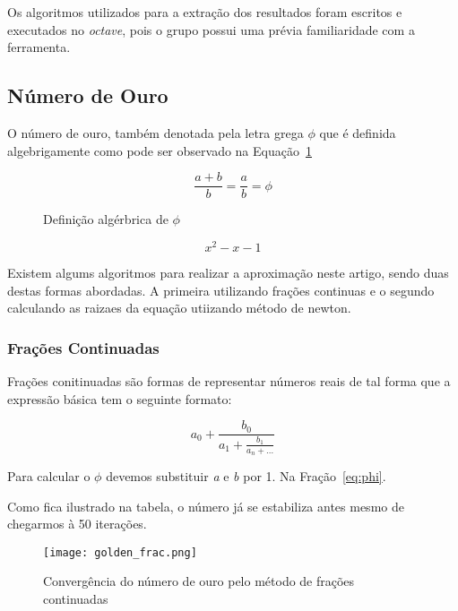 	Os algoritmos utilizados para a extração dos resultados foram escritos e
	executados no \emph{octave}, pois o grupo possui uma prévia familiaridade
	com a ferramenta. 
	
	\subsection{Número de Ouro}
		
		O número de ouro, também denotada pela letra grega $\phi$ que é
		definida algebrigamente como pode ser observado na
		Equação~\ref{eq:phi-algebrico}

		\begin{figure}[H]
			\centering
			\begin{equation}
				\frac{a+b}{b} = \frac{a}{b} = \phi
			\end{equation}
			\label{eq:phi-algebrico}
			\caption{Definição algérbrica de $\phi$}
		\end{figure}


		
		\begin{equation}
			x^2-x-1
		\end{equation}

		Existem algums algoritmos para realizar a aproximação neste artigo,
		sendo duas destas formas  abordadas. A primeira utilizando frações
		continuas e o segundo calculando as raizaes da equação utiizando método
		de newton.

		\subsubsection{Frações Continuadas}

			Frações conitinuadas são formas de representar números reais de tal
			forma que a expressão básica tem o seguinte formato:

			\begin{equation}\label{eq:phi}
				a_0 + \frac{b_0}{a_1 + \frac{b_1}{a_n + \dots}}
			\end{equation}

			Para calcular o $\phi$ devemos substituir \emph{a} e \emph{b} por 1.
			Na Fração~\ref{eq:phi}.

			

			Como fica ilustrado na tabela, o número já se estabiliza antes mesmo
			de chegarmos à 50 iterações.

			\begin{figure}[H]
				\centering
				\texttt{[image: golden\_frac.png]}
				\caption{Convergência do número de ouro pelo método de frações continuadas}
				\label{golden_frac}
			\end{figure}


